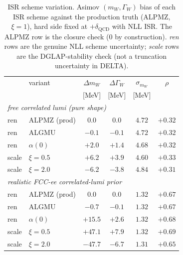 \documentclass[11pt,a4paper]{article}
\newcommand{\mW}{m_W}
\newcommand{\GammaW}{\Gamma_W}
\begin{document}
\begin{table}[h]
\centering
\caption{ISR scheme variation. Asimov $(\mW,\GammaW)$ bias of each ISR
scheme against the production truth (ALPMZ, $\xi=1$), hard side fixed at
$+\delta_\text{QCD}$ with NLL ISR. The ALPMZ row is the closure check
($0$ by construction). \emph{ren} rows are the genuine NLL scheme
uncertainty; \emph{scale} rows are the DGLAP-stability check (not a
truncation uncertainty in DELTA).}
\label{tab:isr-scheme}
\begin{tabular}{l l c c c c}
\toprule
 & variant & $\Delta\mW$ & $\Delta\GammaW$ & $\sigma_{\mW}$ & $\rho$ \\
 & & [MeV] & [MeV] & [MeV] & \\
\midrule
\multicolumn{6}{l}{\emph{free correlated lumi (pure shape)}}\\
ren   & ALPMZ (prod)        & $0.0$  & $0.0$  & $4.72$ & $+0.32$ \\
ren   & ALGMU               & $-0.1$ & $-0.1$ & $4.72$ & $+0.32$ \\
ren   & $\alpha(0)$         & $+2.0$ & $+1.4$ & $4.68$ & $+0.32$ \\
scale & $\xi=0.5$           & $+6.2$ & $+3.9$ & $4.60$ & $+0.33$ \\
scale & $\xi=2.0$           & $-6.2$ & $-3.8$ & $4.84$ & $+0.31$ \\
\midrule
\multicolumn{6}{l}{\emph{realistic FCC-ee correlated-lumi prior}}\\
ren   & ALPMZ (prod)        & $0.0$   & $0.0$   & $1.32$ & $+0.67$ \\
ren   & ALGMU               & $-0.7$  & $-0.1$  & $1.32$ & $+0.67$ \\
ren   & $\alpha(0)$         & $+15.5$ & $+2.6$  & $1.32$ & $+0.68$ \\
scale & $\xi=0.5$           & $+47.1$ & $+7.9$  & $1.32$ & $+0.69$ \\
scale & $\xi=2.0$           & $-47.7$ & $-6.7$  & $1.31$ & $+0.65$ \\
\bottomrule
\end{tabular}
\end{table}
\end{document}
